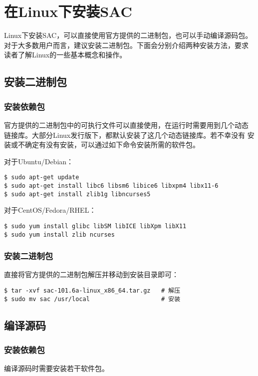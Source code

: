 \section{在Linux下安装SAC}
\label{sec:sac-install-for-linux}

Linux下安装SAC，可以直接使用官方提供的二进制包，也可以手动编译源码包。
对于大多数用户而言，建议安装二进制包。下面会分别介绍两种安装方法，要求
读者了解Linux的一些基本概念和操作。

\subsection{安装二进制包}
\subsubsection{安装依赖包}
官方提供的二进制包中的可执行文件可以直接使用，在运行时需要用到几个动态
链接库。大部分Linux发行版下，都默认安装了这几个动态链接库。若不幸没有
安装或不确定有没有安装，可以通过如下命令安装所需的软件包。

对于Ubuntu/Debian：
\begin{verbatim}
$ sudo apt-get update
$ sudo apt-get install libc6 libsm6 libice6 libxpm4 libx11-6
$ sudo apt-get install zlib1g libncurses5
\end{verbatim}

对于CentOS/Fedora/RHEL：
\begin{verbatim}
$ sudo yum install glibc libSM libICE libXpm libX11
$ sudo yum install zlib ncurses
\end{verbatim}

\subsubsection{安装二进制包}
直接将官方提供的二进制包解压并移动到安装目录即可：
\begin{verbatim}
$ tar -xvf sac-101.6a-linux_x86_64.tar.gz   # 解压
$ sudo mv sac /usr/local                    # 安装
\end{verbatim}

\subsection{编译源码}
\subsubsection{安装依赖包}
编译源码时需要安装若干软件包。


